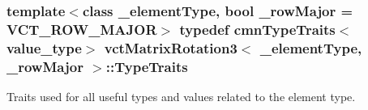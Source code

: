 \hypertarget{classvct_matrix_rotation3_a17e78ff6b4b66abf1f301c136652e503}{
\subsubsection[{Type\-Traits}]{\setlength{\rightskip}{0pt plus 5cm}template$<$class \-\_\-element\-Type, bool \-\_\-row\-Major = V\-C\-T\-\_\-\-R\-O\-W\-\_\-\-M\-A\-J\-O\-R$>$ typedef {\bf cmn\-Type\-Traits}$<$value\-\_\-type$>$ {\bf vct\-Matrix\-Rotation3}$<$ \-\_\-element\-Type, \-\_\-row\-Major $>$\-::{\bf Type\-Traits}}}\label{classvct_matrix_rotation3_a17e78ff6b4b66abf1f301c136652e503}
Traits used for all useful types and values related to the element type. 

